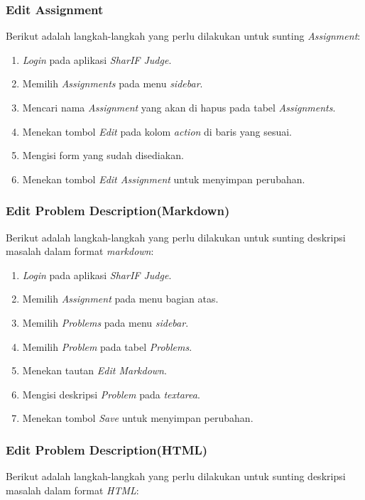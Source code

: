 \subsubsection{Edit Assignment}
\label{subsubsec:skenario_edit_assignment}
Berikut adalah langkah-langkah yang perlu dilakukan untuk sunting \textit{Assignment}:

\begin{enumerate}
	\item \textit{Login} pada aplikasi \textit{SharIF Judge}.
	\item Memilih \textit{Assignments} pada menu \textit{sidebar}.
	\item Mencari nama \textit{Assignment} yang akan di hapus pada tabel \textit{Assignments}.
	\item Menekan tombol \textit{Edit} pada kolom \textit{action} di baris yang sesuai.
	\item Mengisi form yang sudah disediakan.
	\item Menekan tombol \textit{Edit Assignment} untuk menyimpan perubahan.
\end{enumerate}

\subsubsection{Edit Problem Description(Markdown)}
\label{subsubsec:skenario_edit_problem_description_markdown}
Berikut adalah langkah-langkah yang perlu dilakukan untuk sunting deskripsi masalah dalam format \textit{markdown}:

\begin{enumerate}
	\item \textit{Login} pada aplikasi \textit{SharIF Judge}.
	\item Memilih \textit{Assignment} pada menu bagian atas.
	\item Memilih \textit{Problems} pada menu \textit{sidebar}.
	\item Memilih \textit{Problem} pada tabel \textit{Problems}.
	\item Menekan tautan \textit{Edit Markdown}.
	\item Mengisi deskripsi \textit{Problem} pada \textit{textarea}.
	\item Menekan tombol \textit{Save} untuk menyimpan perubahan.
\end{enumerate}

\subsubsection{Edit Problem Description(HTML)}
\label{subsubsec:skenario_edit_problem_description_html}
Berikut adalah langkah-langkah yang perlu dilakukan untuk sunting deskripsi masalah dalam format \textit{HTML}:

